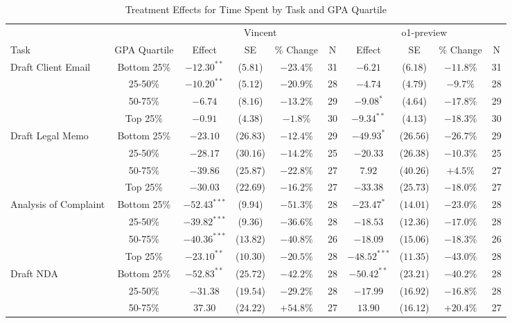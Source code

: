 \begin{table}[!htbp]
\centering
\caption{Treatment Effects for Time Spent by Task and GPA Quartile}
\label{tab:time_spent_gpa}
\begin{tabular}{lccccccccc}
\hline\hline
& & \multicolumn{4}{c}{Vincent} & \multicolumn{4}{c}{o1-preview} \\
\cline{3-10}
Task & GPA Quartile & Effect & SE & \% Change & N & Effect & SE & \% Change & N \\
\hline
\multirow{4}{*}{Draft Client Email} & Bottom 25\% & $-12.30^{**}$ & ($5.81$) & $-23.4\%$ & 31 & $-6.21$ & ($6.18$) & $-11.8\%$ & 31 \\
& 25-50\% & $-10.20^{**}$ & ($5.12$) & $-20.9\%$ & 28 & $-4.74$ & ($4.79$) & $-9.7\%$ & 28 \\
& 50-75\% & $-6.74$ & ($8.16$) & $-13.2\%$ & 29 & $-9.08^{*}$ & ($4.64$) & $-17.8\%$ & 29 \\
& Top 25\% & $-0.91$ & ($4.38$) & $-1.8\%$ & 30 & $-9.34^{**}$ & ($4.13$) & $-18.3\%$ & 30 \\
\hline
\multirow{4}{*}{Draft Legal Memo} & Bottom 25\% & $-23.10$ & ($26.83$) & $-12.4\%$ & 29 & $-49.93^{*}$ & ($26.56$) & $-26.7\%$ & 29 \\
& 25-50\% & $-28.17$ & ($30.16$) & $-14.2\%$ & 25 & $-20.33$ & ($26.38$) & $-10.3\%$ & 25 \\
& 50-75\% & $-39.86$ & ($25.87$) & $-22.8\%$ & 27 & $7.92$ & ($40.26$) & $+4.5\%$ & 27 \\
& Top 25\% & $-30.03$ & ($22.69$) & $-16.2\%$ & 27 & $-33.38$ & ($25.73$) & $-18.0\%$ & 27 \\
\hline
\multirow{4}{*}{Analysis of Complaint} & Bottom 25\% & $-52.43^{***}$ & ($9.94$) & $-51.3\%$ & 28 & $-23.47^{*}$ & ($14.01$) & $-23.0\%$ & 28 \\
& 25-50\% & $-39.82^{***}$ & ($9.36$) & $-36.6\%$ & 28 & $-18.53$ & ($12.36$) & $-17.0\%$ & 28 \\
& 50-75\% & $-40.36^{***}$ & ($13.82$) & $-40.8\%$ & 26 & $-18.09$ & ($15.06$) & $-18.3\%$ & 26 \\
& Top 25\% & $-23.10^{**}$ & ($10.30$) & $-20.5\%$ & 28 & $-48.52^{***}$ & ($11.35$) & $-43.0\%$ & 28 \\
\hline
\multirow{4}{*}{Draft NDA} & Bottom 25\% & $-52.83^{**}$ & ($25.72$) & $-42.2\%$ & 28 & $-50.42^{**}$ & ($23.21$) & $-40.2\%$ & 28 \\
& 25-50\% & $-31.38$ & ($19.54$) & $-29.2\%$ & 28 & $-17.99$ & ($16.92$) & $-16.8\%$ & 28 \\
& 50-75\% & $37.30$ & ($24.22$) & $+54.8\%$ & 27 & $13.90$ & ($16.12$) & $+20.4\%$ & 27 \\

\end{tabular}
\end{table}
